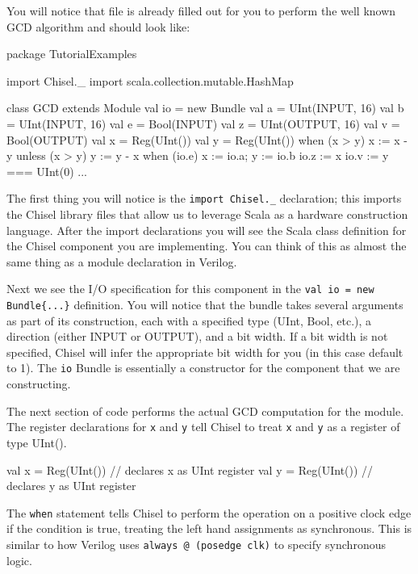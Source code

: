 You will notice that file is already filled out for you to perform the well known GCD algorithm and should look like:

\begin{scala}
package TutorialExamples

import Chisel._
import scala.collection.mutable.HashMap

class GCD extends Module {
  val io = new Bundle {
    val a  = UInt(INPUT,  16)
    val b  = UInt(INPUT,  16)
    val e  = Bool(INPUT)
    val z  = UInt(OUTPUT, 16)
    val v  = Bool(OUTPUT)
  }
  val x  = Reg(UInt())
  val y  = Reg(UInt())
  when   (x > y) { x := x - y } 
  unless (x > y) { y := y - x }
  when (io.e) { x := io.a; y := io.b }
  io.z := x
  io.v := y === UInt(0)
} ...
\end{scala}

The first thing you will notice is the \verb+import Chisel._+ declaration; this imports the Chisel library files that allow us to leverage Scala as a hardware construction language. After the import declarations you will see the Scala class definition for the Chisel component you are implementing. You can think of this as almost the same thing as a module declaration in Verilog.

Next we see the I/O specification for this component in the \verb+val io = new Bundle{...}+ definition. You will notice that the bundle takes several arguments as part of its construction, each with a specified type (UInt, Bool, etc.), a direction (either INPUT or OUTPUT), and a bit width. If a bit width is not specified, Chisel will infer the appropriate bit width for you (in this case default to 1). The \verb+io+ Bundle is essentially a constructor for the component that we are constructing.

The next section of code performs the actual GCD computation for the module. The register declarations for \verb+x+ and \verb+y+ tell Chisel to treat \verb+x+ and \verb+y+ as a register of type UInt(). 

\begin{scala}
val x = Reg(UInt()) // declares x as UInt register
val y = Reg(UInt()) // declares y as UInt register
\end{scala}

The \verb+when+ statement tells Chisel to perform the operation on a positive clock edge if the condition is true, treating the left hand assignments as synchronous. This is similar to how Verilog uses \verb+always @ (posedge clk)+ to specify synchronous logic.

